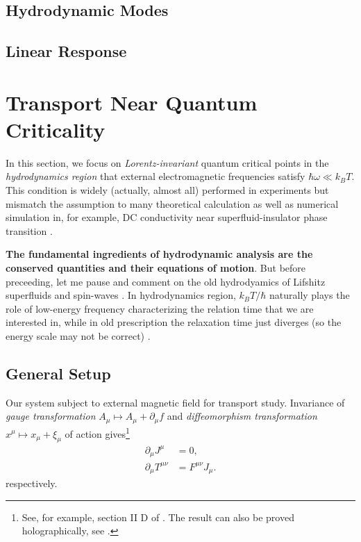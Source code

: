 \documentclass[10pt,nofootinbib]{revtex4}
\begin{document}
	\subsection{Hydrodynamic Modes}
	\subsection{Linear Response}

\section{Transport Near Quantum Criticality}
	In this section, we focus on \emph{Lorentz-invariant} quantum critical points in the \emph{hydrodynamics region} that external electromagnetic frequencies satisfy $\hbar\omega\ll k_B T$. This condition is widely (actually, almost all) performed in experiments but mismatch the assumption to many theoretical calculation as well as numerical simulation in, for example, DC conductivity near superfluid-insulator phase transition \cite{damle1997nonzero}.\par
	\textbf{The fundamental ingredients of hydrodynamic analysis are the conserved quantities and their equations of motion}. But before preceeding, let me pause and comment on the old hydrodyamics of Lifshitz superfluids and spin-waves \cite{hohenberg1977theory,halperin1969hydrodynamic}. {\color{red} In hydrodynamics region, $k_BT/\hbar$ naturally plays the role of low-energy frequency characterizing the relation time that we are interested in, while in old prescription the relaxation time just diverges (so the energy scale may not be correct) \cite{hartnoll2007theory}}.

	\subsection{General Setup}
		Our system subject to external magnetic field for transport study. Invariance of \emph{gauge transformation} $A_\mu\mapsto A_\mu+\partial_\mu f$ and \emph{diffeomorphism transformation} $x^\mu\mapsto x_\mu+\xi_\mu$ of action gives\footnote{See, for example, section II D of \cite{herzog2009lectures}. The result can also be proved holographically, see \cite{lindgren2015holographic}.}
		\begin{align}\label{2.1.1}
			\partial_\mu J^\mu&=0,\\
			\partial_\mu T^{\mu\nu}&=F^{\mu\nu}J_\mu.
		\end{align}
		respectively.
		
\end{document}

